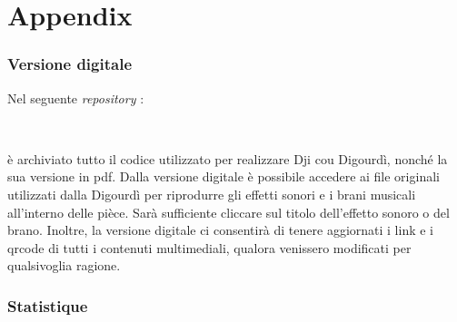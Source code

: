 \documentclass[11pt, twoside, openright]{book}
\begin{document}
\frontmatter

\clearpage
\thispagestyle{empty}



\tableofcontents
\clearpage
\listofvideos
\listofsounds
\listofeffets
\listoffotos




\mainmatter

%
%
%
%
%
%
%
%
%
% 


\backmatter
\chapter*{Appendix}
\pagestyle{plain}
\subsection*{Versione digitale}
Nel seguente \textit{repository} :
\begin{center}
\centering
\github\ \hspace*{0.5mm} \href{\detokenize{https://github.com/jbollon/Dji-cou-Digourdi}}{} \hspace*{0.5mm} \github\\
 \vspace*{2mm}
\end{center}
\noindent è archiviato tutto il codice utilizzato per realizzare Dji cou Digourdì, nonché la sua versione in pdf. Dalla versione digitale è possibile accedere ai file originali utilizzati dalla Digourdì per riprodurre gli effetti sonori e i brani musicali all'interno delle pièce. Sarà sufficiente cliccare sul titolo dell'effetto sonoro o del brano.
Inoltre, la versione digitale ci consentirà di  tenere aggiornati i link e i qrcode di tutti i contenuti multimediali, qualora venissero modificati per qualsivoglia ragione.

\newpage
\subsection*{Statistique}
%


\end{document}
